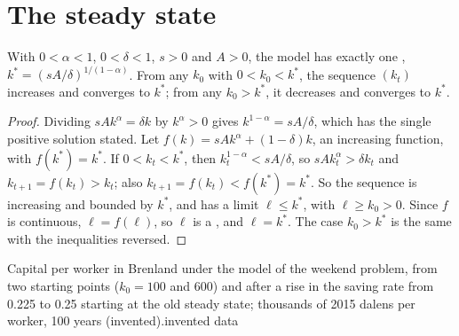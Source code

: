 \section{The steady state}\label{sec:g12:solow-first-look:steady}

\begin{proposition}\label{prop:g12:solow-first-look:steady}
With $0 < \alpha < 1$, $0 < \delta < 1$, $s > 0$ and $A > 0$, the model has exactly one , $k^* = (sA/\delta)^{1/(1 - \alpha)}$. From any $k_0$ with
$0 < k_0 < k^*$, the sequence $(k_t)$ increases and converges to $k^*$; from any $k_0 > k^*$, it decreases and converges to $k^*$.
\end{proposition}
\begin{proof}
Dividing $sAk^{\alpha} = \delta k$ by $k^{\alpha} > 0$ gives $k^{1 - \alpha} = sA/\delta$, which has the single positive solution stated. Let $f(k) = sAk^{\alpha} + (1 - \delta)k$,
an increasing function, with $f(k^*) = k^*$. If $0 < k_t < k^*$, then $k_t^{1 - \alpha} < sA/\delta$, so $sAk_t^{\alpha} > \delta k_t$ and $k_{t+1} = f(k_t) > k_t$; also
$k_{t+1} = f(k_t) < f(k^*) = k^*$. So the sequence is increasing and bounded by $k^*$, and has a limit $\ell \le k^*$, with $\ell \ge k_0 > 0$. Since $f$ is continuous,
$\ell = f(\ell)$, so $\ell$ is a , and $\ell = k^*$. The case $k_0 > k^*$ is the same with the inequalities reversed.
\end{proof}

\begin{omchart}{Capital per worker in Brenland under the model of the weekend problem, from two starting points ($k_0 = 100$ and 600) and after a rise in the saving rate from
0.225 to 0.25 starting at the old steady state; thousands of 2015 dalens per worker, 100 years (invented).}{invented data}
\end{omchart}

